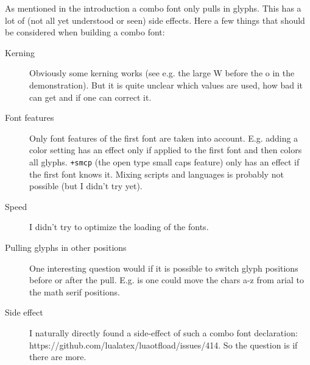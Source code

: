 \documentclass[parskip=half-,egregdoesnotlikesansseriftitles]{scrartcl}
\begin{document}
As mentioned in the introduction a combo font only pulls in glyphs. This has a lot of (not all yet understood or seen) side effects. Here a few things that should be considered when building a combo font:

\begin{description}
  \item[Kerning] Obviously some kerning works (see e.g. the large W before the o in the demonstration). But it is quite unclear which values are used, how bad it can get and if one can correct it.
  \item[Font features] Only font features of the first font are taken into account. E.g. adding a color setting has an effect only if applied to the first font and then colors all glyphs. \verb!+smcp! (the open type small caps feature) only has an effect if the first font knows it. Mixing scripts and languages is probably not possible (but I didn't try yet).
  \item[Speed] I didn't try to optimize the loading of the fonts. 
  \item[Pulling glyphs in other positions] One interesting question would if it is possible to switch glyph positions before or after the pull. E.g. is one could move the chars a-z from arial to the math serif positions. 
  \item[Side effect] I naturally directly found a side-effect of such a combo font declaration: https://github.com/lualatex/luaotfload/issues/414. So the question is if there are more.
\end{description}
\end{document}
